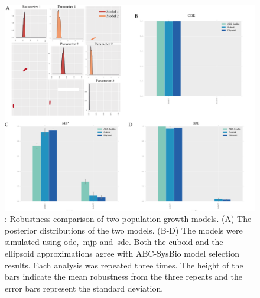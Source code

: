 \begin{figure}[p]
\begin{center}
\includegraphics[width=\textwidth]{../../chapters/chapterStabilityFinder/images/ex4_summ.png}
\caption[Robustness analysis of case study 2]{\label{fig:rob_sysbio4}: Robustness comparison of two population growth models. (A) The posterior distributions of the two models. (B-D) The models were simulated using \acrshort{ode},~\acrshort{mjp} and~\acrshort{sde}. Both the cuboid and the ellipsoid approximations agree with ABC-SysBio model selection results. Each analysis was repeated three times. The height of the bars indicate the mean robustness from the three repeats and the error bars represent the standard deviation. }
\end{center}
\end{figure}

\clearpage



